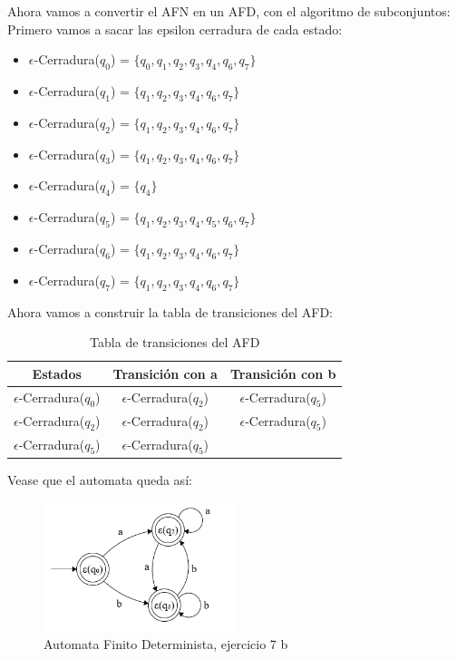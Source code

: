 \begin{enumerate}
    Ahora vamos a convertir el AFN en un AFD, con el algoritmo de subconjuntos:
    Primero vamos a sacar las epsilon cerradura de cada estado:
    \begin{itemize}
        \item $\epsilon$-Cerradura($q_0$) = $\{q_0, q_1, q_2, q_3, q_4, q_6, q_7\}$
        \item $\epsilon$-Cerradura($q_1$) = $\{q_1, q_2, q_3, q_4, q_6, q_7\}$
        \item $\epsilon$-Cerradura($q_2$) = $\{q_1, q_2, q_3, q_4, q_6, q_7\}$
        \item $\epsilon$-Cerradura($q_3$) = $\{q_1, q_2, q_3, q_4, q_6, q_7\}$
        \item $\epsilon$-Cerradura($q_4$) = $\{q_4\}$
        \item $\epsilon$-Cerradura($q_5$) = $\{q_1, q_2, q_3, q_4, q_5, q_6, q_7\}$
        \item $\epsilon$-Cerradura($q_6$) = $\{q_1, q_2, q_3, q_4, q_6, q_7\}$
        \item $\epsilon$-Cerradura($q_7$) = $\{q_1, q_2, q_3, q_4, q_6, q_7\}$
    \end{itemize}
    Ahora vamos a construir la tabla de transiciones del AFD:
    \begin{table}[h!]        
    \centering
    \begin{tabular}{|c|c|c|}
    \hline
    \textbf{Estados} & \textbf{Transición con a} & \textbf{Transición con b } \\
    \hline
    $\epsilon$-Cerradura($q_0$) &$\epsilon$-Cerradura($q_2$) & $\epsilon$-Cerradura($q_5$) \\
    \hline      
    $\epsilon$-Cerradura($q_2$) & $\epsilon$-Cerradura($q_2$) & $\epsilon$-Cerradura($q_5$) \\
    \hline 
    $\epsilon$-Cerradura($q_5$) & $\epsilon$-Cerradura($q_5$) \\
    \hline
    \end{tabular}
    \caption{Tabla de transiciones del AFD} 
    \end{table}

    Vease que el automata queda así: \\

    \begin{figure}[h!]
        \centering
        \includegraphics[width=0.5\textwidth]{images/7bDFAnoMinimizado.png}
        \caption{Automata Finito Determinista, ejercicio 7 b}
    \end{figure}
    \newpage


\end{enumerate}
